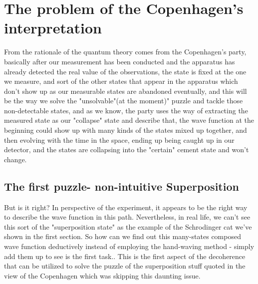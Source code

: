 \documentclass[final,1p,12pt]{elsarticle}
\begin{document}
\section{The problem of the Copenhagen's interpretation}
From the rationale of the quantum theory comes from the Copenhagen's party, basically after our measurement has been conducted and the apparatus has already detected the real value of the observations, the state is fixed at the one we measure, and sort of the other states that appear in the apparatus which don't show up as our measurable states are abandoned eventually, and this will be the way we solve the "unsolvable"(at the moment)" puzzle and tackle those non-detectable states, and as we know, the party uses the way of extracting the measured state as our "collapse" state and describe that, the wave function at the beginning could show up with many kinds of the states mixed up together, and then evolving with the time in the space, ending up being caught up in our detector, and the states are collapsing into the "certain" cement state and won't change.\\ 

\subsection{The first puzzle- non-intuitive Superposition}
But is it right? In perspective of the experiment, it appears to be the right way to describe the wave function in this path. Nevertheless, in real life,  we can't see this sort of the "superposition state" as the example of the Schrodinger cat we've shown in the first section. So how can we find out this many-states composed wave function deductively instead of employing the hand-waving method - simply add them up to see is the first task.. This is the first aspect of the decoherence that can be utilized to solve the puzzle of the superposition stuff quoted in the view of the Copenhagen which was skipping this daunting issue.\\ 
\end{document}
